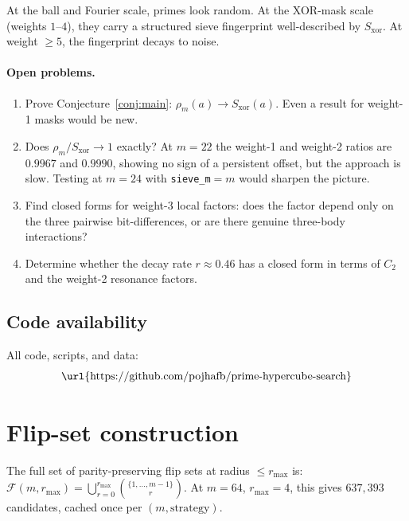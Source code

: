 \documentclass[12pt]{article}
\begin{document}
At the ball and Fourier scale, primes look random.
At the XOR-mask scale (weights $1$--$4$), they carry a structured sieve fingerprint
well-described by $S_{\mathrm{xor}}$.
At weight $\geq 5$, the fingerprint decays to noise.

\paragraph{Open problems.}
\begin{enumerate}[label=(\roman*)]
  \item Prove Conjecture~\ref{conj:main}: $\rho_m(a) \to S_{\mathrm{xor}}(a)$.
    Even a result for weight-1 masks would be new.
  \item Does $\rho_m/S_{\mathrm{xor}} \to 1$ exactly?
    At $m=22$ the weight-1 and weight-2 ratios are $0.9967$ and $0.9990$,
    showing no sign of a persistent offset, but the approach is slow.
    Testing at $m=24$ with \texttt{sieve\_m}$=m$ would sharpen the picture.
  \item Find closed forms for weight-3 local factors:
    does the factor depend only on the three pairwise bit-differences,
    or are there genuine three-body interactions?
  \item Determine whether the decay rate $r \approx 0.46$ has a closed form
    in terms of $C_2$ and the weight-2 resonance factors.
\end{enumerate}

\subsection*{Code availability}

All code, scripts, and data:
\[
  \text{\url{https://github.com/pojhafb/prime-hypercube-search}}
\]

\appendix

\section{Flip-set construction}
\label{app:flipsets}

The full set of parity-preserving flip sets at radius $\leq r_{\max}$ is:
$\mathcal{F}(m, r_{\max}) = \bigcup_{r=0}^{r_{\max}} \binom{\{1,\ldots,m-1\}}{r}$.
At $m = 64$, $r_{\max} = 4$, this gives $637{,}393$ candidates,
cached once per $(m, \text{strategy})$.
\end{document}
